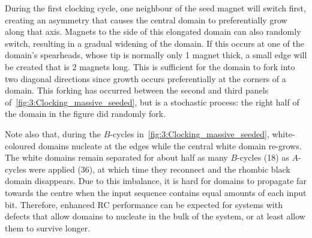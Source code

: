 \vspace{-1em}
\vspace{-1em}

During the first clocking cycle, one neighbour of the seed magnet will switch first, creating an asymmetry that causes the central domain to preferentially grow along that axis.
Magnets to the side of this elongated domain can also randomly switch, resulting in a gradual widening of the domain.
If this occurs at one of the domain's spearheads, whose tip is normally only 1 magnet thick, a small edge will be created that is 2 magnets long.
This is sufficient for the domain to fork into two diagonal directions since growth occurs preferentially at the corners of a domain.
This forking has occurred between the second and third panels of~\cref{fig:3:Clocking_massive_seeded}, but is a stochastic process: the right half of the domain in the figure did randomly fork. \par
Note also that, during the $B$-cycles in~\cref{fig:3:Clocking_massive_seeded}, white-coloured domains nucleate at the edges while the central white domain re-grows.
The white domains remain separated for about half as many $B$-cycles (18) as $A$-cycles were applied (36), at which time they reconnect and the rhombic black domain disappears.
Due to this imbalance, it is hard for domains to propagate far towards the centre when the input sequence contains equal amounts of each input bit.
Therefore, enhanced RC performance can be expected for systems with defects that allow domains to nucleate in the bulk of the system, or at least allow them to survive longer.

